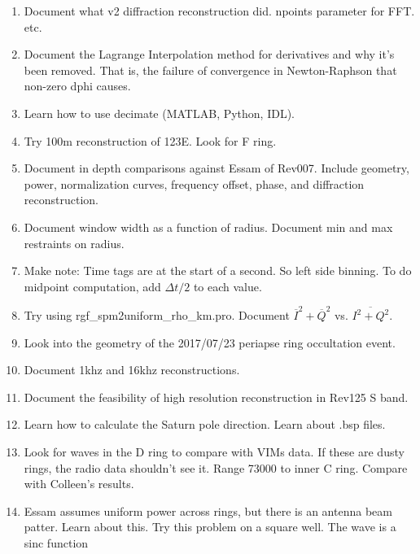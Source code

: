 \documentclass[crop=false,class=article,oneside]{standalone}
\begin{document}
\begin{enumerate}
            \item Document what v2 diffraction reconstruction did.
                  npoints parameter for FFT. etc.
            \item Document the Lagrange Interpolation method for
                  derivatives and why it's been removed. That is,
                  the failure of convergence in Newton-Raphson that
                  non-zero dphi causes.
            \item Learn how to use decimate (MATLAB, Python, IDL).
            \item Try 100m reconstruction of 123E. Look for F ring.
            \item Document in depth comparisons against Essam of Rev007.
                  Include geometry, power, normalization curves,
                  frequency offset, phase, and diffraction
                  reconstruction.
            \item Document window width as a function of radius.
                  Document min and max restraints on radius.
            \item Make note: Time tags are at the start of a second.
                  So left side binning. To do midpoint computation,
                  add $\Delta{t}/2$ to each value.
            \item Try using rgf\_spm2uniform\_rho\_km.pro. Document
                  $\overline{I}^{2}+\overline{Q}^{2}$ vs.
                  $\overline{I^{2}+Q^{2}}$.
            \item Look into the geometry of the 2017/07/23 periapse
                  ring occultation event.
            \item Document 1khz and 16khz reconstructions.
            \item Document the feasibility of high resolution
                  reconstruction in Rev125 S band.
            \item Learn how to calculate the Saturn pole direction.
                  Learn about .bsp files.
            \item Look for waves in the D ring to compare with VIMs data.
                  If these are dusty rings, the radio data shouldn't
                  see it. Range 73000 to inner C ring. Compare with
                  Colleen's results.
            \item Essam assumes uniform power across rings, but there is
                  an antenna beam patter. Learn about this. Try this
                  problem on a square well. The wave is a sinc function

\end{enumerate}
\end{document}
